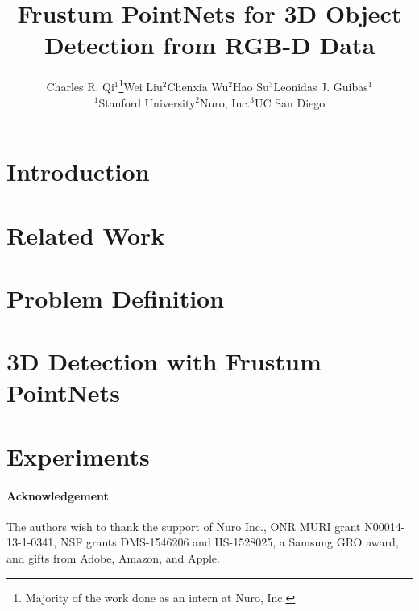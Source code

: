 \documentclass[10pt,twocolumn,letterpaper]{article}
\begin{document}
\title{Frustum PointNets for 3D Object Detection from RGB-D Data}

\author{Charles R. Qi$^1$\thanks{Majority of the work done as an intern at Nuro, Inc.}\qquad Wei Liu$^2$\qquad Chenxia Wu$^2$\qquad Hao Su$^3$\qquad Leonidas J. Guibas$^1$\\
$^1$Stanford University\qquad $^2$Nuro, Inc.\qquad $^3$UC San Diego}

\maketitle

\begin{abstract}
  
\end{abstract}

\section{Introduction}


\section{Related Work}


\section{Problem Definition}


\section{3D Detection with Frustum PointNets}


\section{Experiments}


\vspace{-.11in}
\paragraph{Acknowledgement}
The authors wish to thank the support of Nuro Inc., ONR MURI grant N00014-13-1-0341, NSF grants DMS-1546206 and  IIS-1528025, a Samsung GRO award, and gifts from Adobe, Amazon, and Apple.

% 

\newpage
{\small


}

\newpage

\end{document}
